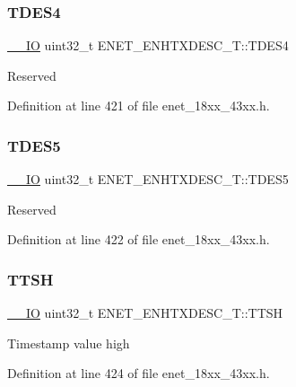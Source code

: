 \subsubsection{\texorpdfstring{T\+D\+E\+S4}{TDES4}}
{\footnotesize\ttfamily \hyperlink{core__sc300_8h_aec43007d9998a0a0e01faede4133d6be}{\+\_\+\+\_\+\+IO} uint32\+\_\+t E\+N\+E\+T\+\_\+\+E\+N\+H\+T\+X\+D\+E\+S\+C\+\_\+\+T\+::\+T\+D\+E\+S4}

Reserved 

Definition at line 421 of file enet\+\_\+18xx\+\_\+43xx.\+h.

\mbox{\label{struct_e_n_e_t___e_n_h_t_x_d_e_s_c___t_a29502d0eaea16c50f92a30f6baacf3d7}} 
\subsubsection{\texorpdfstring{T\+D\+E\+S5}{TDES5}}
{\footnotesize\ttfamily \hyperlink{core__sc300_8h_aec43007d9998a0a0e01faede4133d6be}{\+\_\+\+\_\+\+IO} uint32\+\_\+t E\+N\+E\+T\+\_\+\+E\+N\+H\+T\+X\+D\+E\+S\+C\+\_\+\+T\+::\+T\+D\+E\+S5}

Reserved 

Definition at line 422 of file enet\+\_\+18xx\+\_\+43xx.\+h.

\mbox{\label{struct_e_n_e_t___e_n_h_t_x_d_e_s_c___t_a8225712b45fa04875a253796c53256b7}} 
\subsubsection{\texorpdfstring{T\+T\+SH}{TTSH}}
{\footnotesize\ttfamily \hyperlink{core__sc300_8h_aec43007d9998a0a0e01faede4133d6be}{\+\_\+\+\_\+\+IO} uint32\+\_\+t E\+N\+E\+T\+\_\+\+E\+N\+H\+T\+X\+D\+E\+S\+C\+\_\+\+T\+::\+T\+T\+SH}

Timestamp value high 

Definition at line 424 of file enet\+\_\+18xx\+\_\+43xx.\+h.

